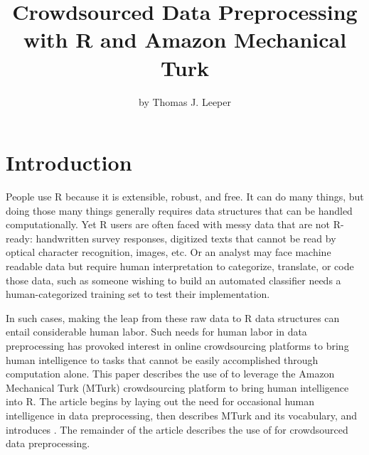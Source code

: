 \title{Crowdsourced Data Preprocessing with R and Amazon Mechanical Turk}
\author{by Thomas J. Leeper}

\maketitle


\section{Introduction}

People use R because it is extensible, robust, and free. It can do many things, but doing those many things generally requires data structures that can be handled computationally. Yet R users are often faced with messy data that are not R-ready: handwritten survey responses, digitized texts that cannot be read by optical character recognition, images, etc. Or an analyst may face machine readable data but require human interpretation to categorize, translate, or code those data, such as someone wishing to build an automated classifier needs a human-categorized training set to test their implementation.

In such cases, making the leap from these raw data to R data structures can entail considerable human labor. Such needs for human labor in data preprocessing has provoked interest in online crowdsourcing platforms \citep{Schmidt2010, ChenMenezesBradley2011} to bring human intelligence to tasks that cannot be easily accomplished through computation alone. This paper describes the use of  \citep{Leeper2012c} to leverage the Amazon Mechanical Turk (MTurk) crowdsourcing platform to bring human intelligence into R. The article begins by laying out the need for occasional human intelligence in data preprocessing, then describes MTurk and its vocabulary, and introduces . The remainder of the article describes the use of  for crowdsourced data preprocessing.

